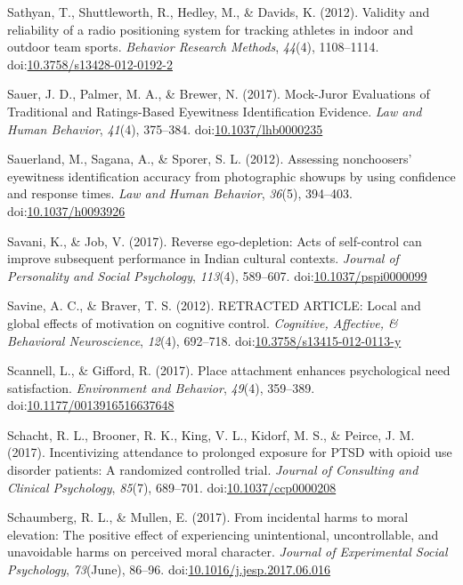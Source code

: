 \documentclass[english,man]{apa6}
\theoremstyle{definition}
\theoremstyle{definition}
\theoremstyle{definition}
\theoremstyle{remark}
\begin{document}
\hypertarget{ref-Sathyan2012}{}
Sathyan, T., Shuttleworth, R., Hedley, M., \& Davids, K. (2012).
Validity and reliability of a radio positioning system for tracking
athletes in indoor and outdoor team sports. \emph{Behavior Research
Methods}, \emph{44}(4), 1108--1114.
doi:\href{https://doi.org/10.3758/s13428-012-0192-2}{10.3758/s13428-012-0192-2}

\hypertarget{ref-Sauer2017}{}
Sauer, J. D., Palmer, M. A., \& Brewer, N. (2017). Mock-Juror
Evaluations of Traditional and Ratings-Based Eyewitness Identification
Evidence. \emph{Law and Human Behavior}, \emph{41}(4), 375--384.
doi:\href{https://doi.org/10.1037/lhb0000235}{10.1037/lhb0000235}

\hypertarget{ref-Sauerland2012}{}
Sauerland, M., Sagana, A., \& Sporer, S. L. (2012). Assessing
nonchoosers' eyewitness identification accuracy from photographic
showups by using confidence and response times. \emph{Law and Human
Behavior}, \emph{36}(5), 394--403.
doi:\href{https://doi.org/10.1037/h0093926}{10.1037/h0093926}

\hypertarget{ref-Savani2017}{}
Savani, K., \& Job, V. (2017). Reverse ego-depletion: Acts of
self-control can improve subsequent performance in Indian cultural
contexts. \emph{Journal of Personality and Social Psychology},
\emph{113}(4), 589--607.
doi:\href{https://doi.org/10.1037/pspi0000099}{10.1037/pspi0000099}

\hypertarget{ref-Savine2012}{}
Savine, A. C., \& Braver, T. S. (2012). RETRACTED ARTICLE: Local and
global effects of motivation on cognitive control. \emph{Cognitive,
Affective, \& Behavioral Neuroscience}, \emph{12}(4), 692--718.
doi:\href{https://doi.org/10.3758/s13415-012-0113-y}{10.3758/s13415-012-0113-y}

\hypertarget{ref-Scannell2017}{}
Scannell, L., \& Gifford, R. (2017). Place attachment enhances
psychological need satisfaction. \emph{Environment and Behavior},
\emph{49}(4), 359--389.
doi:\href{https://doi.org/10.1177/0013916516637648}{10.1177/0013916516637648}

\hypertarget{ref-Schacht2017a}{}
Schacht, R. L., Brooner, R. K., King, V. L., Kidorf, M. S., \& Peirce,
J. M. (2017). Incentivizing attendance to prolonged exposure for PTSD
with opioid use disorder patients: A randomized controlled trial.
\emph{Journal of Consulting and Clinical Psychology}, \emph{85}(7),
689--701.
doi:\href{https://doi.org/10.1037/ccp0000208}{10.1037/ccp0000208}

\hypertarget{ref-Schaumberg2017}{}
Schaumberg, R. L., \& Mullen, E. (2017). From incidental harms to moral
elevation: The positive effect of experiencing unintentional,
uncontrollable, and unavoidable harms on perceived moral character.
\emph{Journal of Experimental Social Psychology}, \emph{73}(June),
86--96.
doi:\href{https://doi.org/10.1016/j.jesp.2017.06.016}{10.1016/j.jesp.2017.06.016}
\end{document}
